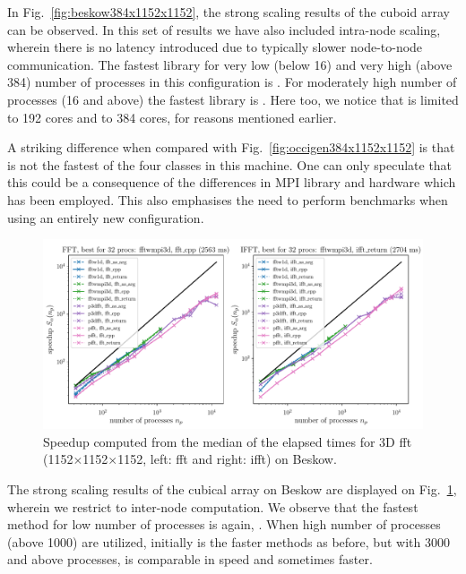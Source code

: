 \documentclass{../jors}
\begin{document}
In Fig.~\ref{fig:beskow384x1152x1152}, the strong scaling results of the cuboid
array can be observed. In this set of results we have also included intra-node
scaling, wherein there is no latency introduced due to typically slower
node-to-node communication. The fastest library for very low (below 16) and
very high (above 384) number of processes in this configuration is
. For moderately high number of processes (16 and above) the
fastest library is . Here too, we notice that
 is limited to 192 cores and  to 384
cores, for reasons mentioned earlier.

A striking difference when compared with Fig.~\ref{fig:occigen384x1152x1152} is
that  is not the fastest of the four classes in this machine.
One can only speculate that this could be a consequence of the differences in MPI
library and hardware which has been employed. This also emphasises the need to
perform benchmarks when using an entirely new configuration.

\begin{figure}[htp!]
\centering
\includegraphics[width=\linewidth]{tmp/fig_beskow_1152x1152x1152}
\caption{Speedup computed from the median of the elapsed times for 3D fft
(1152$\times$1152$\times$1152, left: fft and right: ifft) on Beskow.}
\label{fig:beskow1152x1152x1152}
\end{figure}

The strong scaling results of the cubical array on Beskow are displayed on
Fig.~\ref{fig:beskow1152x1152x1152}, wherein we restrict to inter-node
computation.  We observe that the fastest method for low number of processes is
again, . When high number of processes (above 1000)
are utilized, initially  is the faster methods as before,
but with 3000 and above processes,  is comparable in speed and
sometimes faster.
\end{document}
